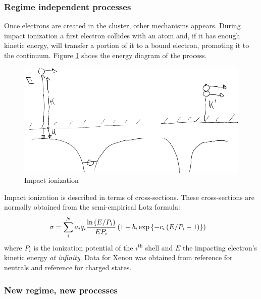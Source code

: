 \subsubsection{Regime independent processes}
\label{section:intro:mechanisms:noregime}
Once electrons are created in the cluster, other mechanisms appears. During
impact ionization a first electron collides with an atom and, if it has enough
kinetic energy, will transfer a portion of it to a bound electron, promoting it
to the continuum. Figure \ref{fig:ionization:impact} shoes the energy diagram
of the process.

\begin{figure}
 \centering
 \includegraphics[width=0.76\columnwidth]{figures/mockups/ionization_impact}
 \caption{Impact ionization}
 \label{fig:ionization:impact}
\end{figure}

Impact ionization is described in terms of cross-sections. These
cross-sections are normally obtained from the semi-empirical Lotz
formula\cite{Lotz1967}:
\begin{align}
\sigma & = \sum_{i}^{N} a_i q_i \frac{\ln{\left( E/P_i \right)}}{E P_i} \left( 1 - b_i
\exp{ \left\{ -c_i \left( E/P_i - 1 \right) \right\}} \right)
\label{eqn:impact:ionization:lotz}
\end{align}
where $P_i$ is the ionization potential of the $i^{\textrm{th}}$ shell and $E$
the impacting electron's kinetic energy \textit{at infinity}.
Data for Xenon was obtained from reference \cite{Tawara1987} for neutrals
and reference \cite{Heidenreich2005} for charged states.


\subsubsection{New regime, new processes}

